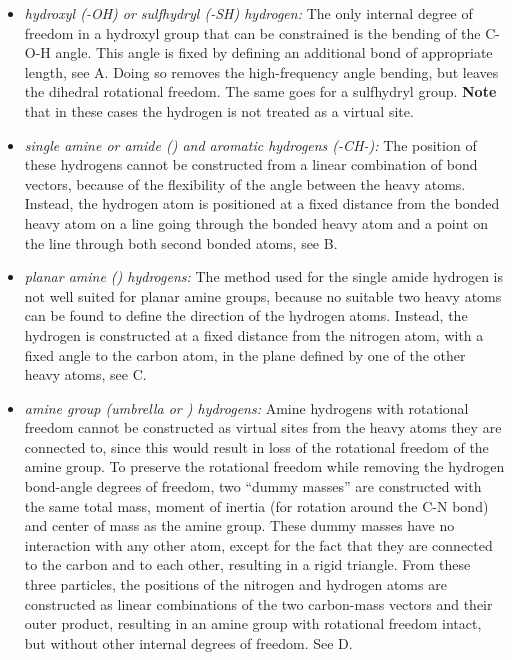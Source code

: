 \begin{itemize}

\item{\em hydroxyl ({\sf -OH}) or sulfhydryl ({\sf -SH})
hydrogen:\/} The only internal degree of freedom in a hydroxyl group
that can be constrained is the bending of the {\sf C-O-H} angle. This
angle is fixed by defining an additional bond of appropriate length,
see A. Doing so removes the high-frequency angle bending,
but leaves the dihedral rotational freedom. The same goes for a
sulfhydryl group. {\bf Note} that in these cases the hydrogen is not treated
as a virtual site.

\item{\em single amine or amide ({\amines}) and aromatic hydrogens
({\sf -CH-}):\/} The position of these hydrogens cannot be constructed
from a linear combination of bond vectors, because of the flexibility
of the angle between the heavy atoms. Instead, the hydrogen atom is
positioned at a fixed distance from the bonded heavy atom on a line
going through the bonded heavy atom and a point on the line through
both second bonded atoms, see B.

\item{\em planar amine ({\amine}) hydrogens:\/} The method used for
the single amide hydrogen is not well suited for planar amine groups,
because no suitable two heavy atoms can be found to define the
direction of the hydrogen atoms. Instead, the hydrogen is constructed
at a fixed distance from the nitrogen atom, with a fixed angle to the
carbon atom, in the plane defined by one of the other heavy atoms, see
C.

\item{\em amine group (umbrella {\amine} or {\aminep}) hydrogens:\/}
Amine hydrogens with rotational freedom cannot be constructed as virtual
sites from the heavy atoms they are connected to, since this would
result in loss of the rotational freedom of the amine group. To
preserve the rotational freedom while removing the hydrogen bond-angle
degrees of freedom, two ``dummy masses'' are constructed with the same
total mass, moment of inertia (for rotation around the {\sf C-N} bond)
and center of mass as the amine group. These dummy masses have no
interaction with any other atom, except for the fact that they are
connected to the carbon and to each other, resulting in a rigid
triangle. From these three particles, the positions of the nitrogen and
hydrogen atoms are constructed as linear combinations of the two
carbon-mass vectors and their outer product, resulting in an amine
group with rotational freedom intact, but without other internal
degrees of freedom. See D.

\end{itemize}

